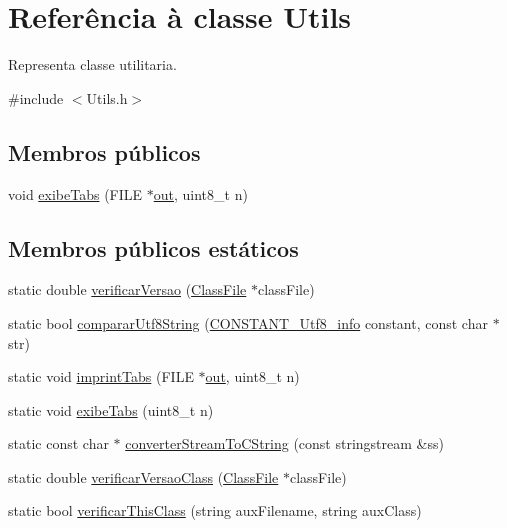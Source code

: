\hypertarget{classUtils}{}\section{Referência à classe Utils}
\label{classUtils}


Representa classe utilitaria.  




{\ttfamily \#include $<$Utils.\+h$>$}

\subsection*{Membros públicos}
\begin{DoxyCompactItemize}
\item 
void \hyperlink{classUtils_aebfca2747bb35554f74b1ad6abe7c2c3}{exibe\+Tabs} (F\+I\+LE $\ast$\hyperlink{ClassVisao_8cpp_a1277960b5f2b37137fe9b0b5a1ea0beb}{out}, uint8\+\_\+t n)
\end{DoxyCompactItemize}
\subsection*{Membros públicos estáticos}
\begin{DoxyCompactItemize}
\item 
static double \hyperlink{classUtils_a234dd450e6192a9ddbcd7e68e9a09841}{verificar\+Versao} (\hyperlink{classClassFile}{Class\+File} $\ast$class\+File)
\item 
static bool \hyperlink{classUtils_a63daf33599b447a8f3b2ea5aef2815ce}{comparar\+Utf8\+String} (\hyperlink{structCONSTANT__Utf8__info}{C\+O\+N\+S\+T\+A\+N\+T\+\_\+\+Utf8\+\_\+info} constant, const char $\ast$str)
\item 
static void \hyperlink{classUtils_a932c28783170c6aa53362fbd0c4ceefa}{imprint\+Tabs} (F\+I\+LE $\ast$\hyperlink{ClassVisao_8cpp_a1277960b5f2b37137fe9b0b5a1ea0beb}{out}, uint8\+\_\+t n)
\item 
static void \hyperlink{classUtils_a2a13f135d652b68fae6f4b8a9b21464e}{exibe\+Tabs} (uint8\+\_\+t n)
\item 
static const char $\ast$ \hyperlink{classUtils_abef6742f09f81fea5952454925325ea5}{converter\+Stream\+To\+C\+String} (const stringstream \&ss)
\item 
static double \hyperlink{classUtils_a71459ff272f47bbce2081ff59fae2d2c}{verificar\+Versao\+Class} (\hyperlink{classClassFile}{Class\+File} $\ast$class\+File)
\item 
static bool \hyperlink{classUtils_aa70b3d26f8b094e4bb4bbf3e05a6bd63}{verificar\+This\+Class} (string aux\+Filename, string aux\+Class)
\end{DoxyCompactItemize}


